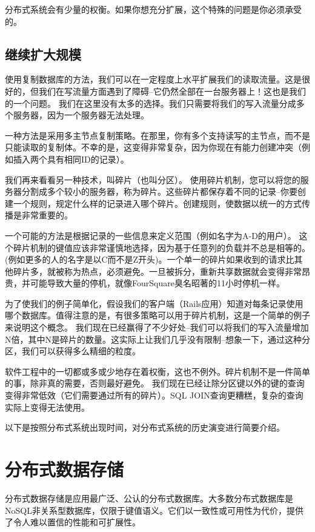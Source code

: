 \documentclass[degree=project,degree-type=project,cjk-font=noto]{thuthesis}
\begin{document}
分布式系统会有少量的权衡。如果你想充分扩展，这个特殊的问题是你必须承受的。

\section{继续扩大规模}

使用复制数据库的方法，我们可以在一定程度上水平扩展我们的读取流量。这是很好的，但我们在写流量方面遇到了障碍--它仍然全部在一台服务器上！这也是我们的一个问题。
我们在这里没有太多的选择。我们只需要将我们的写入流量分成多个服务器，因为一个服务器无法处理。

一种方法是采用多主节点复制策略。在那里，你有多个支持读写的主节点，而不是只能读取的复制体。不幸的是，这变得非常复杂，因为你现在有能力创建冲突（例如插入两个具有相同ID的记录）。

我们再来看看另一种技术，叫碎片（也叫分区）。
使用碎片机制，您可以将您的服务器分割成多个较小的服务器，称为碎片。这些碎片都保存着不同的记录--你要创建一个规则，规定什么样的记录进入哪个碎片。创建规则，使数据以统一的方式传播是非常重要的。

一个可能的方法是根据记录的一些信息来定义范围（例如名字为A-D的用户）。
这个碎片机制的键值应该非常谨慎地选择，因为基于任意列的负载并不总是相等的。(例如更多的人的名字是以C而不是Z开头)。一个单一的碎片如果收到的请求比其他碎片多，就被称为热点，必须避免。一旦被拆分，重新共享数据就会变得非常昂贵，并可能导致大量的停机，就像FourSquare臭名昭著的11小时停机一样。

为了使我们的例子简单化，假设我们的客户端（Rails应用）知道对每条记录使用哪个数据库。值得注意的是，有很多策略可以用于碎片机制，这是一个简单的例子来说明这个概念。
我们现在已经赢得了不少好处--我们可以将我们的写入流量增加N倍，其中N是碎片的数量。这实际上让我们几乎没有限制--想象一下，通过这种分区，我们可以获得多么精细的粒度。

软件工程中的一切都或多或少地存在着权衡，这也不例外。碎片机制不是一件简单的事，除非真的需要，否则最好避免。
我们现在已经让除分区键以外的键的查询变得非常低效（它们需要通过所有的碎片）。SQL JOIN查询更糟糕，复杂的查询实际上变得无法使用。

以下是按照分布式系统出现时间，对分布式系统的历史演变进行简要介绍。

\chapter{分布式数据存储}

分布式数据存储是应用最广泛、公认的分布式数据库。大多数分布式数据库是NoSQL非关系型数据库，仅限于键值语义。它们以一致性或可用性为代价，提供了令人难以置信的性能和可扩展性。
\end{document}
